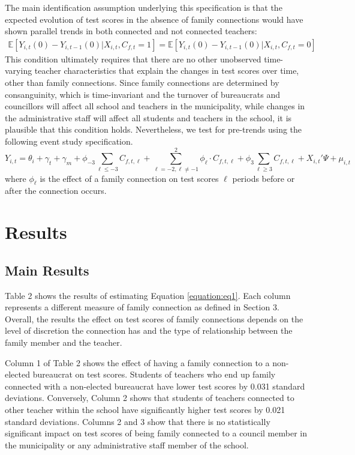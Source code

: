 \documentclass[12pt,runningheads]{article}
\begin{document}
The main identification assumption underlying this specification is that the expected evolution of test scores in the absence of family connections would have shown parallel trends in both connected and not connected teachers:
\begin{align}
    \mathbb{E} [Y_{i,t}(0) - Y_{i,t-1}(0)|X_{i,t},C_{f,t} = 1] =  \mathbb{E} [Y_{i,t}(0) - Y_{i,t-1}(0)|X_{i,t},C_{f,t} = 0] 
\end{align}
This condition ultimately requires that there are no other unobserved time-varying teacher characteristics that explain the changes in test scores over time, other than family connections. Since family connections are determined by consanguinity, which is time-invariant and the turnover of bureaucrats and councillors will affect all school and teachers in the municipality, while changes in the administrative staff will affect all students and teachers in the school, it is plausible that this condition holds. Nevertheless, we test for pre-trends using the following event study specification. 
\begin{dmath}
Y_{i,t}= \theta_{i} +\gamma_t + \gamma_m + \phi_{-3}\sum_{\ell \leq -3} C_{f,t, \ell} + \sum_{\ell = -2, \ell\neq -1 }^{2}\phi_\ell\cdot C_{f,t, \ell}  + 
\phi_{3}\sum_{\ell \geq 3} C_{f,t, \ell} + X_{i,t}'\Psi + \mu_{i,t} 
\label{equation:eq_event}
\end{dmath}
where $\phi_\ell$ is the effect of a family connection on test scores $\ell$ periods before or after the connection occurs. 

\section{Results}

\subsection{Main Results}


Table 2 shows the results of estimating Equation \ref{equation:eq1}. Each column represents a different measure of family connection as defined in Section 3. Overall, the results the effect on test scores of family connections depends on the level of discretion the connection has and the type of relationship between the family member and the teacher.

Column 1 of Table 2 shows the effect of having a family connection to a non-elected bureaucrat on test scores. Students of teachers who end up family connected with a non-elected bureaucrat have lower test scores by 0.031 standard deviations. Conversely, Column 2 shows that students of teachers connected to other teacher within the school have significantly higher test scores by 0.021 standard deviations. Columns 2 and 3 show that there is no statistically significant impact on test scores of being family connected to a council member in the municipality or any administrative staff member of the school.
\end{document}
